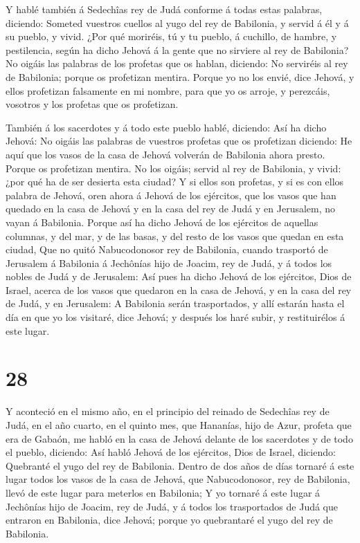  Y hablé también á Sedechîas rey de Judá conforme á todas
estas palabras, diciendo: Someted vuestros cuellos al yugo del rey de
Babilonia, y servid á él y á su pueblo, y vivid.  ¿Por qué
moriréis, tú y tu pueblo, á cuchillo, de hambre, y pestilencia, según ha
dicho Jehová á la gente que no sirviere al rey de Babilonia?
 No oigáis las palabras de los profetas que os hablan,
diciendo: No serviréis al rey de Babilonia; porque os profetizan
mentira.  Porque yo no los envié, dice Jehová, y ellos
profetizan falsamente en mi nombre, para que yo os arroje, y perezcáis,
vosotros y los profetas que os profetizan.

 También á los sacerdotes y á todo este pueblo hablé,
diciendo: Así ha dicho Jehová: No oigáis las palabras de vuestros
profetas que os profetizan diciendo: He aquí que los vasos de la casa de
Jehová volverán de Babilonia ahora presto. Porque os profetizan mentira.
 No los oigáis; servid al rey de Babilonia, y vivid: ¿por
qué ha de ser desierta esta ciudad?  Y si ellos son
profetas, y si es con ellos palabra de Jehová, oren ahora á Jehová de
los ejércitos, que los vasos que han quedado en la casa de Jehová y en
la casa del rey de Judá y en Jerusalem, no vayan á Babilonia.
 Porque así ha dicho Jehová de los ejércitos de aquellas
columnas, y del mar, y de las basas, y del resto de los vasos que quedan
en esta ciudad,  Que no quitó Nabucodonosor rey de
Babilonia, cuando trasportó de Jerusalem á Babilonia á Jechônías hijo de
Joacim, rey de Judá, y á todos los nobles de Judá y de Jerusalem:
 Así pues ha dicho Jehová de los ejércitos, Dios de Israel,
acerca de los vasos que quedaron en la casa de Jehová, y en la casa del
rey de Judá, y en Jerusalem:  A Babilonia serán
trasportados, y allí estarán hasta el día en que yo los visitaré, dice
Jehová; y después los haré subir, y restituirélos á este lugar.

\hypertarget{section-27}{%
\section{28}\label{section-27}}

 Y aconteció en el mismo año, en el principio del reinado de
Sedechîas rey de Judá, en el año cuarto, en el quinto mes, que Hananías,
hijo de Azur, profeta que era de Gabaón, me habló en la casa de Jehová
delante de los sacerdotes y de todo el pueblo, diciendo: 
Así habló Jehová de los ejércitos, Dios de Israel, diciendo: Quebranté
el yugo del rey de Babilonia.  Dentro de dos años de días
tornaré á este lugar todos los vasos de la casa de Jehová, que
Nabucodonosor, rey de Babilonia, llevó de este lugar para meterlos en
Babilonia;  Y yo tornaré á este lugar á Jechônías hijo de
Joacim, rey de Judá, y á todos los trasportados de Judá que entraron en
Babilonia, dice Jehová; porque yo quebrantaré el yugo del rey de
Babilonia.

